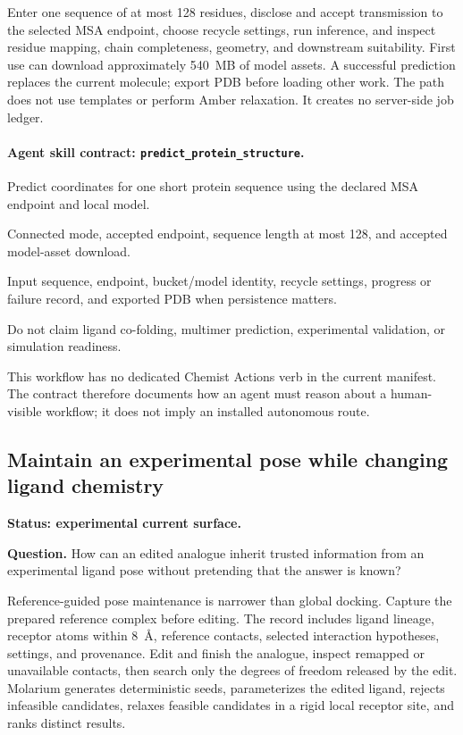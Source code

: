 \begin{small}
Enter one sequence of at most 128 residues, disclose and accept transmission to the selected MSA endpoint, choose recycle settings, run inference, and inspect residue mapping, chain completeness, geometry, and downstream suitability. First use can download approximately 540~MB of model assets. A successful prediction replaces the current molecule; export PDB before loading other work. The path does not use templates or perform Amber relaxation. It creates no server-side job ledger.

\paragraph{Agent skill contract: \texttt{predict\_protein\_structure}.}

\begin{description}[leftmargin=2.2cm,style=nextline]
\item[Goal] Predict coordinates for one short protein sequence using the declared MSA endpoint and local model.
\item[Preconditions] Connected mode, accepted endpoint, sequence length at most 128, and accepted model-asset download.
\item[Evidence] Input sequence, endpoint, bucket/model identity, recycle settings, progress or failure record, and exported PDB when persistence matters.
\item[Stop] Do not claim ligand co-folding, multimer prediction, experimental validation, or simulation readiness.
\end{description}

This workflow has no dedicated Chemist Actions verb in the current manifest. The contract therefore documents how an agent must reason about a human-visible workflow; it does not imply an installed autonomous route.

\subsection{Maintain an experimental pose while changing ligand chemistry}\label{appB:pose}

\textbf{Status: experimental current surface.}

\textbf{Question.} How can an edited analogue inherit trusted information from an experimental ligand pose without pretending that the answer is known?

Reference-guided pose maintenance is narrower than global docking. Capture the prepared reference complex before editing. The record includes ligand lineage, receptor atoms within 8~\AA{}, reference contacts, selected interaction hypotheses, settings, and provenance. Edit and finish the analogue, inspect remapped or unavailable contacts, then search only the degrees of freedom released by the edit. Molarium generates deterministic seeds, parameterizes the edited ligand, rejects infeasible candidates, relaxes feasible candidates in a rigid local receptor site, and ranks distinct results.


\end{small}
